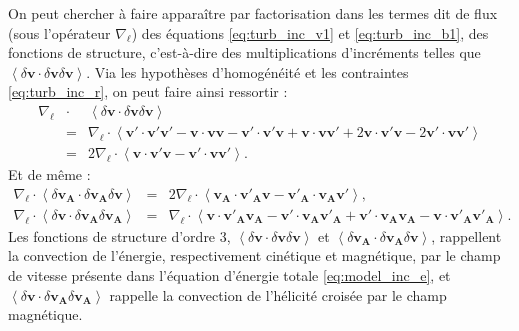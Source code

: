 On peut  chercher à faire apparaître par factorisation dans les termes dit \og de flux \fg{} (sous l'opérateur $\nabla_{\boldsymbol{\ell}} $) des équations \eqref{eq:turb_inc_v1} et \eqref{eq:turb_inc_b1}, des fonctions de structure, c'est-à-dire des multiplications d'incréments telles que $\left<\delta \boldsymbol{v} \cdot \delta \boldsymbol{v} \delta \boldsymbol{v} \right>$. Via les hypothèses d'homogénéité et les contraintes \eqref{eq:turb_inc_r}, on peut faire ainsi ressortir : 
\begin{eqnarray}
\label{eq:turb_inc_fs1} \nabla_{\boldsymbol{\ell}} &\cdot& \left<\delta \boldsymbol{v} \cdot \delta \boldsymbol{v} \delta \boldsymbol{v} \right> \nonumber \\
 &=&  \nabla_{\boldsymbol{\ell}} \cdot \left<  \boldsymbol{v'} \cdot \boldsymbol{v'} \boldsymbol{v'} - \boldsymbol{v} \cdot \boldsymbol{v} \boldsymbol{v} - \boldsymbol{v'} \cdot \boldsymbol{v'} \boldsymbol{v} + \boldsymbol{v} \cdot \boldsymbol{v} \boldsymbol{v'} + 2 \boldsymbol{v} \cdot \boldsymbol{v'} \boldsymbol{v} - 2 \boldsymbol{v'} \cdot \boldsymbol{v} \boldsymbol{v'}\right>  \nonumber\\
  &=& 2 \nabla_{\boldsymbol{\ell}} \cdot \left< \boldsymbol{v} \cdot \boldsymbol{v'} \boldsymbol{v} - \boldsymbol{v'} \cdot \boldsymbol{v} \boldsymbol{v'}\right>.
\end{eqnarray}
Et de même : 
\begin{eqnarray}
\label{eq:turb_inc_fs2}  \nabla_{\boldsymbol{\ell}} \cdot \left<\delta \boldsymbol{v_A} \cdot \delta \boldsymbol{v_A} \delta \boldsymbol{v} \right>  &=& 2 \nabla_{\boldsymbol{\ell}} \cdot \left< \boldsymbol{v_A} \cdot \boldsymbol{v'_A} \boldsymbol{v} - \boldsymbol{v'_A} \cdot \boldsymbol{v_A} \boldsymbol{v'}\right> ,\\
\label{eq:turb_inc_fs3}   \nabla_{\boldsymbol{\ell}} \cdot \left<\delta \boldsymbol{v} \cdot \delta \boldsymbol{v_A} \delta \boldsymbol{v_A} \right>  &=&  \nabla_{\boldsymbol{\ell}} \cdot \left< \boldsymbol{v} \cdot \boldsymbol{v'_A} \boldsymbol{v_A} - \boldsymbol{v'} \cdot \boldsymbol{v_A} \boldsymbol{v'_A} + \boldsymbol{v'} \cdot \boldsymbol{v_A} \boldsymbol{v_A} - \boldsymbol{v} \cdot \boldsymbol{v'_A} \boldsymbol{v'_A}\right> .\quad
\end{eqnarray}
Les fonctions de structure d'ordre 3, $\left<\delta \boldsymbol{v} \cdot \delta \boldsymbol{v} \delta \boldsymbol{v} \right>$ et $\left<\delta \boldsymbol{v_A} \cdot \delta \boldsymbol{v_A} \delta \boldsymbol{v} \right>$, rappellent la convection de l'énergie, respectivement cinétique et magnétique, par le champ de vitesse présente dans l'équation d'énergie totale \eqref{eq:model_inc_e}, et $\left<\delta \boldsymbol{v} \cdot \delta \boldsymbol{v_A} \delta \boldsymbol{v_A} \right>$ rappelle la convection de l'hélicité croisée par le champ magnétique.

